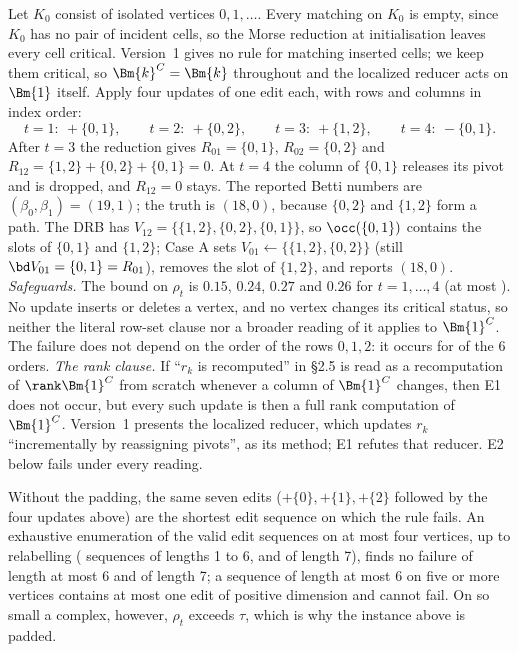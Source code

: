 \begin{example}\label{ex:e1-simplicial}
Let $K_0$ consist of \RefEOneVOnePad{} isolated vertices $0,1,\dots$. Every
matching on $K_0$ is empty, since $K_0$ has no pair of incident cells, so the
Morse reduction at initialisation leaves every cell critical. Version~1 gives no
rule for matching inserted cells; we keep them critical, so $\Bm{k}^C=\Bm{k}$
throughout and the localized reducer acts on $\Bm{1}$ itself. Apply four
updates of one edit each, with rows and columns in index order:
\[
  t=1{:}\ {+}\{0,1\},\qquad t=2{:}\ {+}\{0,2\},\qquad t=3{:}\ {+}\{1,2\},\qquad
  t=4{:}\ {-}\{0,1\}.
\]
After $t=3$ the reduction gives $R_{01}=\{0,1\}$, $R_{02}=\{0,2\}$ and
$R_{12}=\{1,2\}+\{0,2\}+\{0,1\}=0$. At $t=4$ the column of $\{0,1\}$ releases its
pivot and is dropped, and $R_{12}=0$ stays. The reported Betti numbers are
$(\beta_0,\beta_1)=(19,1)$; the truth is $(18,0)$, because $\{0,2\}$ and
$\{1,2\}$ form a path. The DRB has $V_{12}=\{\{1,2\},\{0,2\},\{0,1\}\}$, so
$\occ(\{0,1\})$ contains the slots of $\{0,1\}$ and $\{1,2\}$; Case A sets
$V_{01}\gets\{\{1,2\},\{0,2\}\}$ (still $\bd V_{01}=\{0,1\}=R_{01}$), removes the
slot of $\{1,2\}$, and reports $(18,0)$.
\emph{Safeguards.} The bound on $\rho_t$ is $0.15$, $0.24$, $0.27$ and $0.26$
for $t=1,\dots,4$ (at most \RefEOneVOneRhoMax). No update inserts or deletes a
vertex, and no vertex changes its critical status, so neither the literal
row-set clause nor a broader reading of it applies to $\Bm{1}^C$. The failure
does not depend on the order of the rows $0,1,2$: it occurs for
\RefEOneVOneRowOrders{} of the 6 orders.
\emph{The rank clause.} If ``$r_k$ is recomputed'' in \S2.5 is read as a
recomputation of $\rank\Bm{1}^C$ from scratch whenever a column of $\Bm{1}^C$
changes, then E1 does not occur, but every such update is then a full rank
computation of $\Bm{1}^C$. Version~1 presents the localized reducer, which
updates $r_k$ ``incrementally by reassigning pivots'', as its method; E1 refutes
that reducer. E2 below fails under every reading.
\end{example}

Without the padding, the same seven edits ($+\{0\},+\{1\},+\{2\}$ followed by
the four updates above) are the shortest edit sequence on which the rule fails.
An exhaustive enumeration of the valid edit sequences on at most four
vertices, up to relabelling (\RefEOneCountsShort{} sequences of lengths 1 to 6,
and \RefEOneCountSeven{} of length 7), finds no failure of length at most 6 and
\RefEOneFailSeven{} of length 7; a sequence of length at most 6 on five or more
vertices contains at most one edit of positive dimension and cannot fail. On so
small a complex, however, $\rho_t$ exceeds $\tau$, which is why the instance above
is padded.


